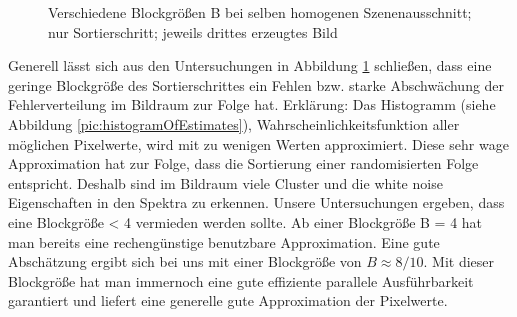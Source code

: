 \begin{figure}[H]
    \caption{Verschiedene Blockgrößen B bei selben homogenen Szenenausschnitt; nur Sortierschritt; jeweils drittes erzeugtes Bild}
    \label{fig:VerschiedeneBlockgrößenSorting}
      
\end{figure}

Generell lässt sich aus den Untersuchungen in Abbildung \ref{fig:VerschiedeneBlockgrößenSorting} schließen,
dass eine geringe Blockgröße des Sortierschrittes ein Fehlen bzw. starke Abschwächung der 
 Fehlerverteilung im Bildraum zur Folge hat. Erklärung: Das Histogramm
(siehe Abbildung \ref{pic:histogramOfEstimates}), Wahrscheinlichkeitsfunktion
aller möglichen Pixelwerte, wird mit zu wenigen Werten approximiert. Diese sehr wage Approximation 
hat zur Folge, dass die Sortierung einer randomisierten Folge entspricht. Deshalb sind im Bildraum
viele Cluster und die white noise Eigenschaften in den Spektra zu erkennen.
Unsere Untersuchungen ergeben, dass eine Blockgröße < 4 vermieden werden sollte. Ab einer Blockgröße
B = 4 hat man bereits eine rechengünstige benutzbare Approximation. Eine gute Abschätzung ergibt sich 
bei uns mit einer Blockgröße von $B \approx 8/10$. Mit dieser Blockgröße hat man immernoch eine gute 
effiziente parallele Ausführbarkeit garantiert und liefert eine generelle gute Approximation der 
Pixelwerte.   


